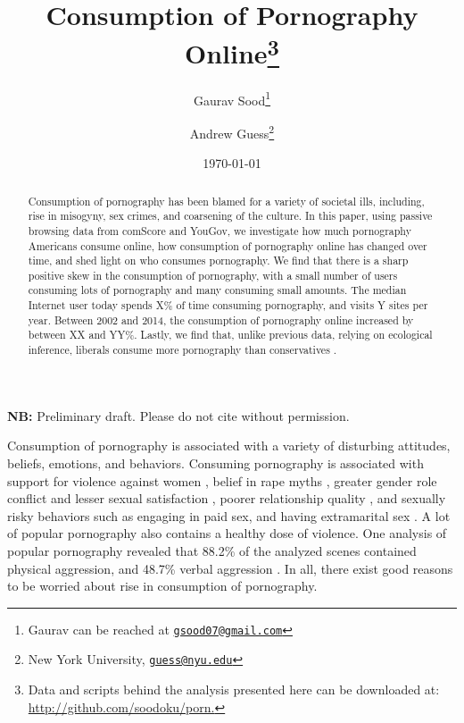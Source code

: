\documentclass[12pt, letterpaper]{article}
\title{\Large{Consumption of Pornography Online}\footnote{Data and scripts behind the analysis presented here can be downloaded at: \href{http://github.com/soodoku/porn}{http://github.com/soodoku/porn.}}}
\author{Gaurav Sood\thanks{Gaurav can be reached at \href{mailto:gsood07@gmail.com}{\footnotesize{\texttt{gsood07@gmail.com}}}} \and Andrew Guess\thanks{New York University, \href{mailto:guess@nyu.edu}{\footnotesize{\texttt{guess@nyu.edu}}}}\vspace{.5cm}}
\date{\vspace{.5cm}\normalsize{\today}}
\begin{document}
\maketitle

\begin{center}
\vspace{.5cm}\textbf{NB:} Preliminary draft. Please do not cite without permission.\vspace{1.5cm}
\end{center}

\begin{abstract}
\noindent Consumption of pornography has been blamed for a variety of societal ills, including, rise in misogyny, sex crimes, and coarsening of the culture. In this paper, using passive browsing data from comScore and YouGov, we investigate how much pornography Americans consume online, how consumption of pornography online has changed over time, and shed light on who consumes pornography. We find that there is a sharp positive skew in the consumption of pornography, with a small number of users consuming lots of pornography and many consuming small amounts. The median Internet user today spends X\% of time consuming pornography, and visits Y sites per year. Between 2002 and 2014, the consumption of pornography online increased by between XX and YY\%. Lastly, we find that, unlike previous data, relying on ecological inference, liberals consume more pornography than conservatives \citep{macinnis2015american, edelman2009markets}.
\end{abstract} 
\clearpage
\doublespace

Consumption of pornography is associated with a variety of disturbing attitudes, beliefs, emotions, and behaviors. Consuming pornography is associated with support for violence against women \citep{hald2010pornography, malamuth2012pornography, donnerstein1984pornography}, belief in rape myths \citep{foubert2011pornography}, greater gender role conflict and lesser sexual satisfaction \citep{szymanski2014psychological, stewart2012young}, poorer relationship quality \citep{szymanski2014psychological, szymanski2015male}, and sexually risky behaviors such as engaging in paid sex, and having extramarital sex \citep{wright2012internet}. A lot of popular pornography also contains a healthy dose of violence. One analysis of popular pornography revealed that 88.2\% of the analyzed scenes contained physical aggression, and 48.7\% verbal aggression \citep{bridges2010aggression}. In all, there exist good reasons to be worried about rise in consumption of pornography.
\end{document}
